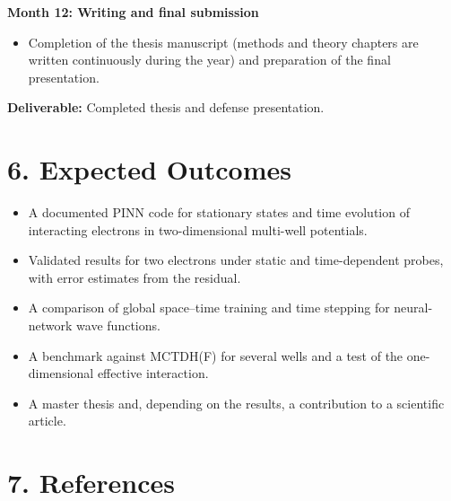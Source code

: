 \documentclass[12pt,a4paper]{article}
\begin{document}
\bigskip

\textbf{Month 12: Writing and final submission}
\begin{itemize}
    \item Completion of the thesis manuscript (methods and theory
    chapters are written continuously during the year) and
    preparation of the final presentation.
\end{itemize}
\textbf{Deliverable:} Completed thesis and defense presentation.

\section*{6. Expected Outcomes}

\begin{itemize}
    \item A documented PINN code for stationary states and time
    evolution of interacting electrons in two-dimensional multi-well
    potentials.
    \item Validated results for two electrons under static and
    time-dependent probes, with error estimates from the residual.
    \item A comparison of global space--time training and time
    stepping for neural-network wave functions.
    \item A benchmark against MCTDH(F) for several wells and a test of
    the one-dimensional effective interaction.
    \item A master thesis and, depending on the results, a
    contribution to a scientific article.
\end{itemize}

\section*{7. References}
\end{document}
